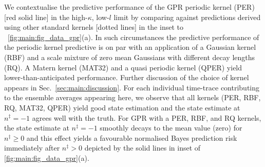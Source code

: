 We contextualise the predictive performance of the GPR periodic kernel (PER) [red solid line] in the high-$\kappa$, low-$l$ limit by comparing against predictions derived using other standard kernels [dotted lines] in the inset to ~\cref{fig:main:fig_data_gpr}(a). In such circumstances the predictive performance of the periodic kernel predictive is on par with an application of a Gaussian kernel (RBF) and a scale mixture of zero mean Gaussians with different decay lengths (RQ).  A Matern kernel (MAT32) and a quasi periodic kernel (QPER) yield lower-than-anticipated performance. Further discussion of the choice of kernel appears in Sec.~\ref{sec:main:discussion}. For each individual time-trace contributing to the ensemble averages appearing here, we observe that all kernels (PER, RBF, RQ, MAT32, QPER) yield good state estimation and the state estimate at $n^\ddagger=-1$ agrees well with the truth. For GPR with a PER, RBF, and RQ kernels, the state estimate at $n^\ddagger=-1$ smoothly decays to the mean value (zero) for $n^\ddagger \geq 0$ and this effect yields a favourable normalised Bayes prediction risk immediately after $n^\ddagger>0$ depicted by the solid lines in inset of \cref{fig:main:fig_data_gpr}(a).

